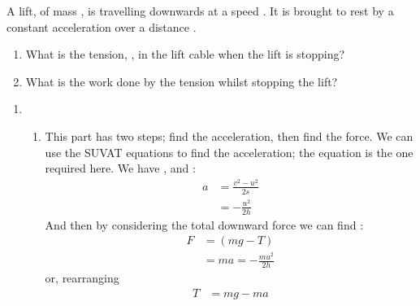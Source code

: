 

\begin{problem}[HE+_Lift]%
{A lift, of  mass , is travelling downwards at a speed . It is brought to rest by a constant acceleration over a distance . 
\begin{enumerate} 
	\item What is the tension, , in the lift cable when the lift is stopping?
	\item What is the work done by the tension whilst stopping the lift?
\end{enumerate}
}
{}
{\begin{enumerate}
\item
\begin{enumerate}
	\item This part has two steps; find the acceleration, then find the force. We can use the SUVAT equations to find the acceleration; the equation  is the one required here. We have , \value{u}{u}{} and \value{s}{h}{}:
\begin{align*} 
a &= \frac{v^{2} - u^{2}}{2s} \\ 
&= -\frac{u^{2}}{2h} 
\end{align*}
And then by considering the total downward force we can find :
\begin{align*} 
F &= (mg - T) \\ 
&= ma = -\frac{mu^{2}}{2h} 
\end{align*}
or, rearranging 
\begin{align*} 
T &= mg - ma \\ 

\end{align*}
\end{enumerate}
\end{enumerate}}
\end{problem}
